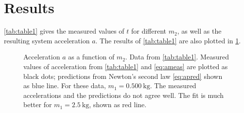 ﻿\documentclass[reprint,amsmath,amssymb,aps,twoside]{revtex4-2}
\begin{document}
%






\section{Results}
\cref{tab:table1} gives the measured values of $t$ for different $m_2$, as well as the resulting system acceleration $a$. The results of \cref{tab:table1} are also plotted in \cref{fig:fig1}.

\begin{figure}
\begin{center}

\end{center}
\caption{\label{fig:fig1} Acceleration $a$ as a function of $m_2$. Data from \cref{tab:table1}. Measured values of acceleration from \cref{tab:table1} and \cref{eq:ameas} are plotted as black dots; predictions from Newton's second law \cref{eq:apred} shown as blue line. For these data, $m_1=\qty{0.500}{\kilo\gram}$. The measured accelerations and the predictions do not agree well. The fit is much better for $m_1=\qty{2.5}{\kilo\gram}$, shown as red line.} 
\end{figure}
%
\end{document}
